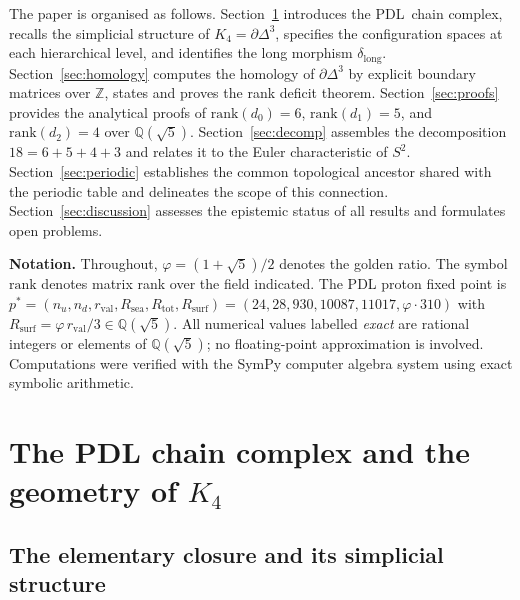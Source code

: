 \documentclass[11pt,a4paper]{article}
\theoremstyle{definition}
\newcommand{\PDL}{\textnormal{PDL}}
\newcommand{\Rsurf}{R_{\mathrm{surf}}}
\newcommand{\Rsea}{R_{\mathrm{sea}}}
\newcommand{\Rtot}{R_{\mathrm{tot}}}
\newcommand{\rval}{r_{\mathrm{val}}}
\newcommand{\Kfour}{K_4}
\newcommand{\Sfour}{\partial\Delta^3}
\newcommand{\rank}{\mathrm{rank}}
\newcommand{\dmap}[1]{d_{#1}}
\newcommand{\dlong}{\delta_{\mathrm{long}}}
\newcommand{\vp}{\varphi}
\begin{document}
The paper is organised as follows. Section~\ref{sec:complex} introduces the \PDL\ chain complex, recalls the simplicial structure of $\Kfour = \Sfour$, specifies the configuration spaces at each hierarchical level, and identifies the long morphism $\dlong$. Section~\ref{sec:homology} computes the homology of $\Sfour$ by explicit boundary matrices over $\mathbb{Z}$, states and proves the rank deficit theorem. Section~\ref{sec:proofs} provides the analytical proofs of $\rank(\dmap{0}) = 6$, $\rank(\dmap{1}) = 5$, and $\rank(\dmap{2}) = 4$ over $\mathbb{Q}(\sqrt{5})$. Section~\ref{sec:decomp} assembles the decomposition $18 = 6+5+4+3$ and relates it to the Euler characteristic of $S^2$. Section~\ref{sec:periodic} establishes the common topological ancestor shared with the periodic table and delineates the scope of this connection. Section~\ref{sec:discussion} assesses the epistemic status of all results and formulates open problems.

\medskip\noindent\textbf{Notation.} Throughout, $\vp = (1+\sqrt{5})/2$ denotes the golden ratio. The symbol $\rank$ denotes matrix rank over the field indicated. The PDL proton fixed point is $p^* = (n_u, n_d, \rval, \Rsea, \Rtot, \Rsurf) = (24, 28, 930, 10087, 11017, \vp \cdot 310)$ with $\Rsurf = \vp\,\rval/3 \in \mathbb{Q}(\sqrt{5})$. All numerical values labelled \emph{exact} are rational integers or elements of $\mathbb{Q}(\sqrt{5})$; no floating-point approximation is involved. Computations were verified with the SymPy computer algebra system using exact symbolic arithmetic.

\section{The PDL chain complex and the geometry of \texorpdfstring{$K_4$}{K4}}
\label{sec:complex}

\subsection{The elementary closure and its simplicial structure}
\label{subsec:K4}
\end{document}

